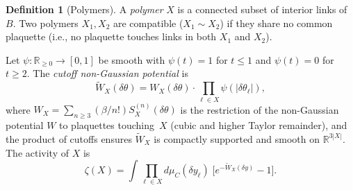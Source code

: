 \documentclass[11pt]{article}
\theoremstyle{definition}
\newtheorem{definition}[theorem]{Definition}
\newcommand{\R}{\mathbb{R}}
\begin{document}
\begin{definition}[Polymers]\label{def:polymer}
A \emph{polymer} $X$ is a connected subset of interior links of $B$.
Two polymers $X_1,X_2$ are compatible ($X_1\sim X_2$) if they
share no common plaquette (i.e., no plaquette touches links in both
$X_1$ and $X_2$).

Let $\psi:\R_{\ge 0}\to[0,1]$ be smooth with $\psi(t)=1$ for $t\le 1$
and $\psi(t)=0$ for $t\ge 2$.  The \emph{cutoff non-Gaussian potential}
is
\begin{equation}
\widetilde{W}_X(\delta\theta)
=W_X(\delta\theta)\cdot\prod_{\ell\in X}\psi(|\delta\theta_\ell|),
\end{equation}
where $W_X=\sum_{n\ge 3}(\beta/n!)S_X^{(n)}(\delta\theta)$ is the
restriction of the non-Gaussian potential $W$ to plaquettes
touching~$X$ (cubic and higher Taylor remainder), and the product of
cutoffs ensures $\widetilde{W}_X$ is compactly supported and smooth
on $\R^{3|X|}$.  The activity of $X$ is
\begin{equation}\label{eq:activity-def}
\zeta(X)=\int\prod_{\ell\in X}d\mu_C(\delta y_\ell)\;
\bigl[e^{-\widetilde{W}_X(\delta y)}-1\bigr].
\end{equation}
\end{definition}
\end{document}
